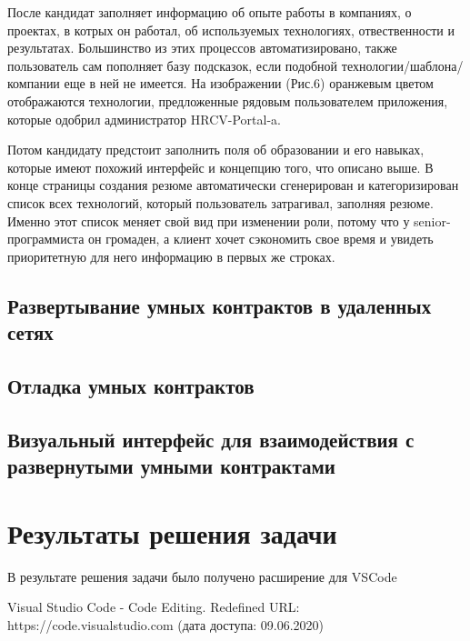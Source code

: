 \documentclass[a4paper,12pt]{diplom}
\begin{document}
После кандидат заполняет информацию об опыте работы в компаниях, о проектах, в котрых он работал, об используемых технологиях, отвественности и результатах.
Большинство из этих процессов автоматизировано, также пользователь сам пополняет базу подсказок, если подобной технологии/шаблона/компании еще в ней не имеется. На изображении (Рис.6) оранжевым цветом отображаются технологии, предложенные рядовым пользователем приложения, которые одобрил администратор HRCV-Portal-a.

Потом кандидату предстоит заполнить поля об образовании и его навыках, которые имеют похожий интерфейс и концепцию того, что описано выше.
В конце страницы создания резюме автоматически сгенерирован и категоризирован список всех технологий, который пользователь затрагивал, заполняя резюме. Именно этот список меняет свой вид при изменении роли, потому что у senior-программиста он
громаден, а клиент хочет сэкономить свое время и увидеть приоритетную для него информацию в первых же строках.

\section{Развертывание умных контрактов в удаленных сетях}

\section{Отладка умных контрактов}

\section{Визуальный интерфейс для взаимодействия с развернутыми умными контрактами}

\chapter{Результаты решения задачи}

В результате решения задачи было получено расширение для VSCode


\renewcommand{\bibname}{Список литературы} 
\begin{thebibliography}{9}

Visual Studio Code - Code Editing. Redefined
URL: https://code.visualstudio.com
(дата доступа: 09.06.2020)

\end{thebibliography}
\end{document}
